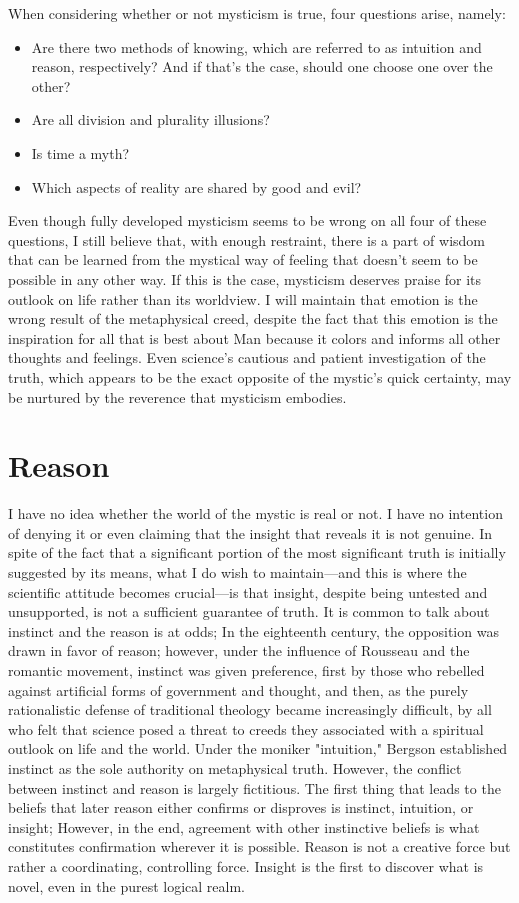 \documentclass[a4paper,12pt]{book}[2004/02/16]
\theoremstyle{ilemma}
\theoremstyle{itheorem}
\theoremstyle{iother}
\theoremstyle{icorollary}
\theoremstyle{numcorollary}
\theoremstyle{idefinition}
\begin{document}
When considering whether or not mysticism is true, four questions arise, namely:
\begin{itemize}
\item Are there two methods of knowing, which are referred to as intuition and reason, respectively? And if that's the case, should one choose one over the other?

\item Are all division and plurality illusions?

\item Is time a myth?

\item Which aspects of reality are shared by good and evil?
\end{itemize}
Even though fully developed mysticism seems to be wrong on all four of these questions, I still believe that, with enough restraint, there is a part of wisdom that can be learned from the mystical way of feeling that doesn't seem to be possible in any other way. If this is the case, mysticism deserves praise for its outlook on life rather than its worldview. I will maintain that emotion is the wrong result of the metaphysical creed, despite the fact that this emotion is the inspiration for all that is best about Man because it colors and informs all other thoughts and feelings. Even science's cautious and patient investigation of the truth, which appears to be the exact opposite of the mystic's quick certainty, may be nurtured by the reverence that mysticism embodies.
\section{Reason}
I have no idea whether the world of the mystic is real or not. I have no intention of denying it or even claiming that the insight that reveals it is not genuine. In spite of the fact that a significant portion of the most significant truth is initially suggested by its means, what I do wish to maintain—and this is where the scientific attitude becomes crucial—is that insight, despite being untested and unsupported, is not a sufficient guarantee of truth. It is common to talk about instinct and the reason is at odds; In the eighteenth century, the opposition was drawn in favor of reason; however, under the influence of Rousseau and the romantic movement, instinct was given preference, first by those who rebelled against artificial forms of government and thought, and then, as the purely rationalistic defense of traditional theology became increasingly difficult, by all who felt that science posed a threat to creeds they associated with a spiritual outlook on life and the world. Under the moniker "intuition," Bergson established instinct as the sole authority on metaphysical truth. However, the conflict between instinct and reason is largely fictitious. The first thing that leads to the beliefs that later reason either confirms or disproves is instinct, intuition, or insight; However, in the end, agreement with other instinctive beliefs is what constitutes confirmation wherever it is possible. Reason is not a creative force but rather a coordinating, controlling force. Insight is the first to discover what is novel, even in the purest logical realm.
\end{document}
